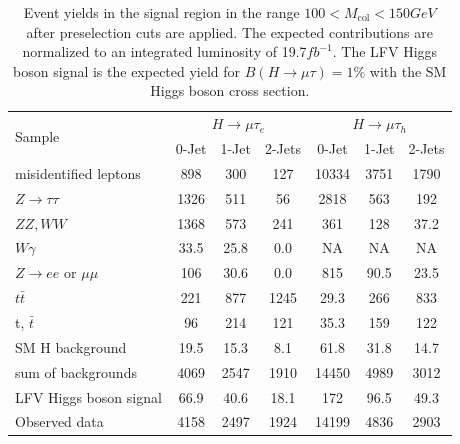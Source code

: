\documentclass[oneside, letterpaper, oldfontcommands]{memoir}
\begin{document}
 \begin{table}[hbtp]
 \centering  \caption{Event yields in the signal region in the range $100 < M_\text{col} < 150GeV$ after preselection cuts are applied. The expected contributions are normalized to an integrated luminosity
of 19.7$fb^{-1}$. The LFV Higgs boson signal is the expected yield for $B(H \rightarrow \mu \tau)=1\%$ with the SM Higgs boson cross section.}
  \label{tab:EventYieldTable_100_to_150_8TeV_Presel}
  \begin{tabular}{lccc|ccc} \hline
        \multirow{2}{*}{Sample}                                & \multicolumn{3}{c}{$H \rightarrow \mu \tau_{e}$}                &     \multicolumn{3}{c}{$H \rightarrow \mu \tau_{h}$}     \\ \cline{2-7}
                                              &  0-Jet            & 1-Jet            & 2-Jets               &  0-Jet             & 1-Jet            & 2-Jets  \\ \hline
    misidentified leptons                    &  898  &   300     &  127 & 10334 & 3751 & 1790\\
    $ Z \rightarrow \tau \tau$                    & 1326   & 511      &  56 & 2818   & 563  & 192  \\
    $ ZZ,WW$                       & 1368   &  573      &  241 & 361   & 128  & 37.2\\
    $ W\gamma$                             &   33.5  &  25.8      &  0.0 &NA & NA & NA    \\
    $ Z \rightarrow ee$ or $\mu \mu$          &  106   &  30.6      &  0.0 & 815 & 90.5& 23.5  \\
    $t\bar{t}     $                            &  221   & 877      & 1245 &29.3 & 266 & 833    \\
    t, $\bar{t}$                             &  96   &  214      &  121 &35.3 & 159 & 122    \\
    SM H background                        &  19.5   &  15.3      &  8.1 &61.8 & 31.8 & 14.7    \\ \hline
    sum of backgrounds                       & 4069   & 2547      & 1910 &14450& 4989 & 3012  \\  \hline
    LFV Higgs boson signal                   &  66.9   &  40.6      &  18.1 &172 & 96.5 & 49.3    \\ \hline \hline
      Observed data                          &  4158    &  2497       &  1924  & 14199 & 4836 & 2903 \\ \hline
  \end{tabular}
\end{table}
\end{document}
